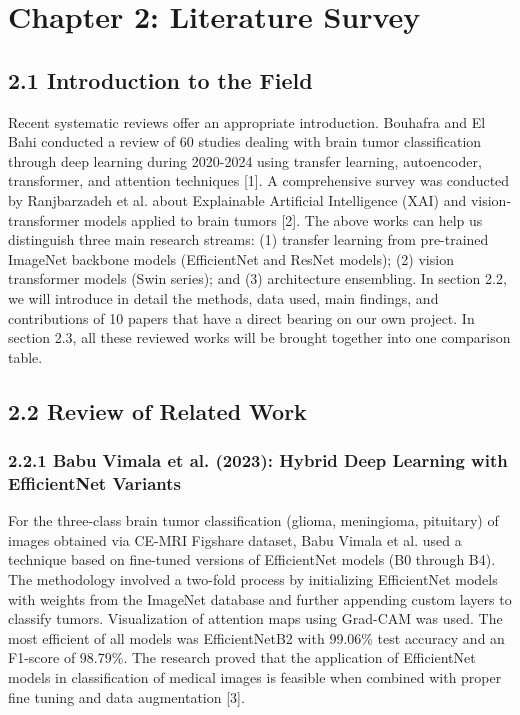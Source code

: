 \documentclass[12pt,a4paper,oneside]{report}
\begin{document}
\chapter*{Chapter 2: Literature Survey}
\section*{2.1 Introduction to the Field}
Recent systematic reviews offer an appropriate introduction. Bouhafra and El Bahi conducted a review of 60 studies dealing with brain tumor classification through deep learning during 2020-2024 using transfer learning, autoencoder, transformer, and attention techniques [1]. A comprehensive survey was conducted by Ranjbarzadeh et al. about Explainable Artificial Intelligence (XAI) and vision-transformer models applied to brain tumors [2]. The above works can help us distinguish three main research streams: (1) transfer learning from pre-trained ImageNet backbone models (EfficientNet and ResNet models); (2) vision transformer models (Swin series); and (3) architecture ensembling.
In section 2.2, we will introduce in detail the methods, data used, main findings, and contributions of 10 papers that have a direct bearing on our own project. In section 2.3, all these reviewed works will be brought together into one comparison table.
\section*{2.2 Review of Related Work}
\subsection*{2.2.1 Babu Vimala et al. (2023): Hybrid Deep Learning with EfficientNet Variants}
For the three-class brain tumor classification (glioma, meningioma, pituitary) of images obtained via CE-MRI Figshare dataset, Babu Vimala et al. used a technique based on fine-tuned versions of EfficientNet models (B0 through B4). The methodology involved a two-fold process by initializing EfficientNet models with weights from the ImageNet database and further appending custom layers to classify tumors. Visualization of attention maps using Grad-CAM was used. The most efficient of all models was EfficientNetB2 with 99.06\% test accuracy and an F1-score of 98.79\%. The research proved that the application of EfficientNet models in classification of medical images is feasible when combined with proper fine tuning and data augmentation [3].
\end{document}
